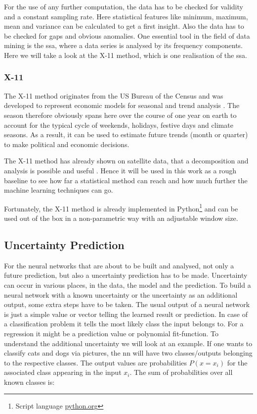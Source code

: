 For the use of any further computation, the data has to be checked for validity and a constant sampling rate. Here statistical features like minimum, maximum, mean and variance can be calculated to get a first insight. Also the data has to be checked for gaps and obvious anomalies. \newline
One essential tool in the field of data mining is the \ac{ssa}, where a data series is analysed by its frequency components. Here we will take a look at the X-11 method, which is one realisation of the \ac{ssa}.

\subsubsection{X-11}
The X-11 method originates from the US Bureau of the Census and was developed to represent economic models for seasonal and trend analysis \cite[p. 1f]{x11-book}. The season therefore obviously spans here over the course of one year on earth to account for the typical cycle of weekends, holidays, festive days and climate seasons. As a result, it can be used to estimate future trends (month or quarter) to make political and economic decisions. 

The X-11 method has already shown on satellite data, that a decomposition and analysis is possible and useful \cite{tm-mining}. Hence it will be used in this work as a rough baseline to see how far a statistical method can reach and how much further the machine learning techniques can go.

Fortunately, the X-11 method is already implemented in Python\footnote{Script language \url{python.org}} and can be used out of the box in a non-parametric way with an adjustable window size.

\subsection{Uncertainty Prediction}
For the neural networks that are about to be built and analysed, not only a future prediction, but also a uncertainty prediction has to be made. Uncertainty can occur in various places, in the data, the model and the prediction. To build a neural network with a known uncertainty or the uncertainty as an additional output, some extra steps have to be taken. The usual output of a neural network is just a simple value or vector telling the learned result or prediction. In case of a classification problem it tells the most likely class the input belongs to. For a regression it might be a prediction value or polynomial fit-function. \newline
To understand the additional uncertainty we will look at an example. If one wants to classify cats and dogs via pictures, the \ac{nn} will have two classes/outputs belonging to the respective classes. The output values are probabilities $P(x=x_i)$ for the associated class appearing in the input $x_i$. The sum of probabilities over all known classes is:

